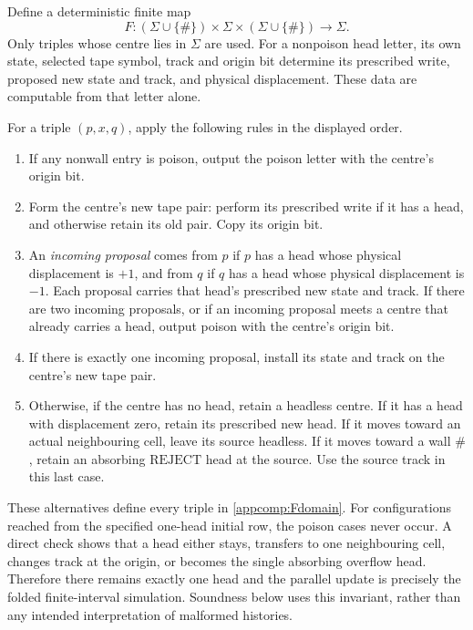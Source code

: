 \documentclass[11pt,reqno]{amsart}
\numberwithin{equation}{section}
\theoremstyle{definition}
\theoremstyle{remark}
\begin{document}
Define a deterministic finite map
\begin{equation}
\label{appcomp:Fdomain}
F:(\Sigma\cup\{\#\})\times\Sigma\times
       (\Sigma\cup\{\#\})\longrightarrow\Sigma .
\end{equation}
Only triples whose centre lies in $\Sigma$ are used.  For a nonpoison head
letter, its own state, selected tape symbol, track and origin bit determine
its prescribed write, proposed new state and track, and physical
displacement.  These data are computable from that letter alone.

For a triple $(p,x,q)$, apply the following rules in the displayed order.
\begin{enumerate}
\item If any nonwall entry is poison, output the poison letter with the
centre's origin bit.
\item Form the centre's new tape pair: perform its prescribed write if it
has a head, and otherwise retain its old pair.  Copy its origin bit.
\item An \emph{incoming proposal} comes from $p$ if $p$ has a head whose
physical displacement is $+1$, and from $q$ if $q$ has a head whose
physical displacement is $-1$.  Each proposal carries that head's
prescribed new state and track.  If there are two incoming proposals,
or if an incoming proposal meets a centre that already carries a head,
output poison with the centre's origin bit.
\item If there is exactly one incoming proposal, install its state and
track on the centre's new tape pair.
\item Otherwise, if the centre has no head, retain a headless centre.  If
it has a head with displacement zero, retain its prescribed new head.
If it moves toward an actual neighbouring cell, leave its source
headless.  If it moves toward a wall $\#$, retain an absorbing
$\mathrm{REJECT}$ head at the source.  Use the source track in this last
case.
\end{enumerate}
These alternatives define every triple in \eqref{appcomp:Fdomain}.
For configurations reached from the specified one-head initial row,
the poison cases never occur.  A direct check shows that a head either
stays, transfers to one neighbouring cell, changes track at the origin,
or becomes the single absorbing overflow head.  Therefore there remains
exactly one head and the parallel update is precisely the folded
finite-interval simulation.  Soundness below uses this invariant, rather
than any intended interpretation of malformed histories.
\end{document}

